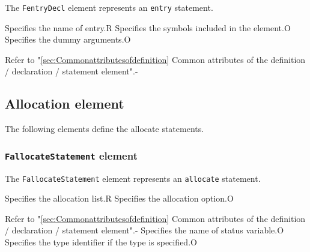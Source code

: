The {\tt FentryDecl} element represents an {\tt entry} statement.


\begin{XcodeMLChildElements}
{Specifies the name of entry.}{R}
{Specifies the symbols included in the element.}{O}
{Specifies the dummy arguments.}{O}
\end{XcodeMLChildElements}

\begin{XcodeMLAttributes}
{Refer to "\ref{sec:Commonattributesofdefinition} Common attributes of the definition / declaration / statement element".}{-}
\end{XcodeMLAttributes}


\subsection{Allocation element}

The following elements define the allocate statements.

\subsubsection{ {\tt FallocateStatement} element}

The {\tt FallocateStatement} element represents an {\tt allocate} statement.


\begin{XcodeMLChildElements}
{Specifies the allocation list.}{R}
{Specifies the allocation option.}{O}
\end{XcodeMLChildElements}

\begin{XcodeMLAttributes}
{Refer to "\ref{sec:Commonattributesofdefinition} Common attributes of the definition / declaration / statement element".}{-}
{Specifies the name of status variable.}{O}
{Specifies the type identifier if the type is specified.}{O}
\end{XcodeMLAttributes}

